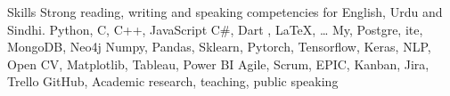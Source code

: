 
\begin{rubric}{Skills}
\entry*[Languages]
	Strong reading, writing and speaking competencies for English, Urdu and Sindhi.
	Python, C, C++, JavaScript C\#, Dart , \LaTeX, \ldots
\entry*[Databases]
	My, Postgre,  ite, MongoDB, Neo4j
	Numpy, Pandas, Sklearn, Pytorch, Tensorflow, Keras, NLP, Open CV, Matplotlib, Tableau, Power BI
	Agile, Scrum, EPIC, Kanban, Jira, Trello
	GitHub, Academic research, teaching, public speaking
\end{rubric}
